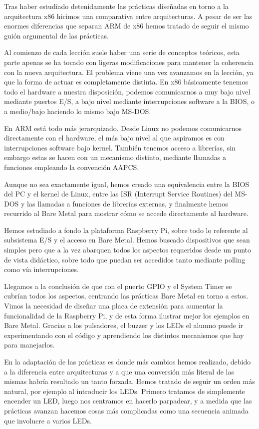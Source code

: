 
Tras haber estudiado detenidamente las prácticas diseñadas en
torno a la arquitectura x86 hicimos una comparativa entre
arquitecturas. A pesar de ser las enormes diferencias que separan
ARM de x86 hemos tratado de seguir el mismo guión argumental
de las prácticas.

Al comienzo de cada lección suele haber una serie de conceptos
teóricos, esta parte apenas se ha tocado con ligeras modificaciones
para mantener la coherencia con la nueva arquitectura. El problema
viene una vez avanzamos en la lección, ya que la forma de actuar
es completamente distinta. En x86 básicamente tenemos todo el
hardware a nuestra disposición, podemos comunicarnos a muy bajo
nivel mediante puertos E/S, a bajo nivel mediante interrupciones
software a la BIOS, o a medio/bajo haciendo lo mismo bajo MS-DOS.

En ARM está todo más jerarquizado. Desde Linux no podemos
comunicarnos directamente con el hardware, el más bajo nivel al
que aspiramos es con interrupciones software bajo kernel. También
tenemos acceso a librerías, sin embargo estas se hacen con un
mecanismo distinto, mediante llamadas a funciones empleando la
convención AAPCS.

Aunque no sea exactamente igual, hemos creado una equivalencia entre
la BIOS del PC y el kernel de Linux, entre las ISR (Interrupt Service
Routines) del MS-DOS y las llamadas a funciones de librerías externas,
y finalmente hemos recurrido al Bare Metal para mostrar cómo se
accede directamente al hardware.

Hemos estudiado a fondo la plataforma Raspberry Pi, sobre todo lo
referente al subsistema E/S y el acceso en Bare Metal. Hemos
buscado dispositivos que sean simples pero que a la vez abarquen
todos los aspectos requeridos desde un punto de vista didáctico,
sobre todo que puedan ser accedidos tanto mediante polling como
vía interrupciones.

Llegamos a la conclusión de que con el puerto GPIO y el System Timer
se cubrían todos los aspectos, centrando las prácticas Bare Metal
en torno a estos. Vimos la necesidad de diseñar una placa de extensión
para aumentar la funcionalidad de la Raspberry Pi, y de esta forma
ilustrar mejor los ejemplos en Bare Metal. Gracias a los pulsadores,
el buzzer y los LEDs el alumno puede ir experimentando con el código
y aprendiendo los distintos mecanismos que hay para manejarlos.

En la adaptación de las prácticas es donde más cambios hemos
realizado, debido a la diferencia entre arquitecturas y a que una
conversión más literal de las mismas habría resultado un tanto
forzada. Hemos tratado de seguir un orden más natural, por ejemplo
al introducir los LEDs. Primero tratamos de simplemente encender
un LED, luego nos centramos en hacerlo parpadear, y a medida que
las prácticas avanzan hacemos cosas más complicadas como una
secuencia animada que involucre a varios LEDs.

